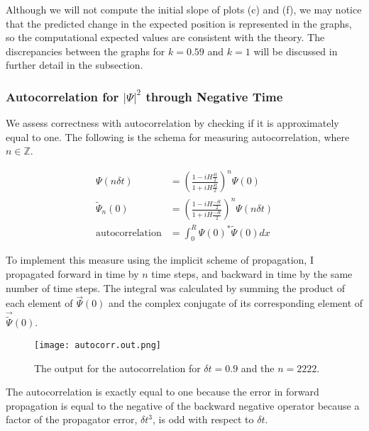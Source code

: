 Although we will not compute the initial slope of plots (c) and (f), we may
notice that the predicted change in the expected position is represented in
the graphs, so the computational expected values are consistent with the
theory. The discrepancies between the graphs for $k = 0.59$ and $k = 1$ will
be discussed in further detail in the  subsection.

\subsubsection*{Autocorrelation for $\left| \Psi \right| ^ 2$ through
Negative Time}

We assess correctness with autocorrelation by checking if it is
approximately equal to one.  The following is the schema for measuring
autocorrelation, where $n \in \mathbb{Z}$.

\begin{align*}
    \Psi(n \delta t) &=
    \left(
    \frac{1 - iH\frac{\delta t}{2}}{1 + iH\frac{\delta t}{2}}
    \right)^n
    \Psi(0)
    \\
    {\tilde{\Psi}}_n(0) &=
    \left(
    \frac{1 - iH\frac{-\delta t}{2}}{1 + iH\frac{-\delta t}{2}}
    \right)^n
    \Psi(n \delta t)
    \\
    \mathrm{autocorrelation} &=
    \int_0^R \Psi(0)^* \tilde{\Psi}(0) dx
\end{align*}

To implement this measure using the implicit scheme of propagation, I
propagated forward in time by $n$ time steps, and backward in time by the
same number of time steps. The integral was calculated by summing the
product of each element of $\vec{\Psi}(0)$ and the complex conjugate of its
corresponding element of $\vec{\tilde{\Psi}}(0)$.

\begin{figure}[H]
    \centering
    \texttt{[image: autocorr.out.png]}
    \caption[Autocorrelation output]{The output for the autocorrelation for
    $\delta t = 0.9$ and the $n = 2222$.}
\end{figure}

The autocorrelation is exactly equal to one because the error in forward
propagation is equal to the negative of the backward negative operator
because a factor of the propagator error, $\delta t^3$, is odd with respect
to $\delta t$.

